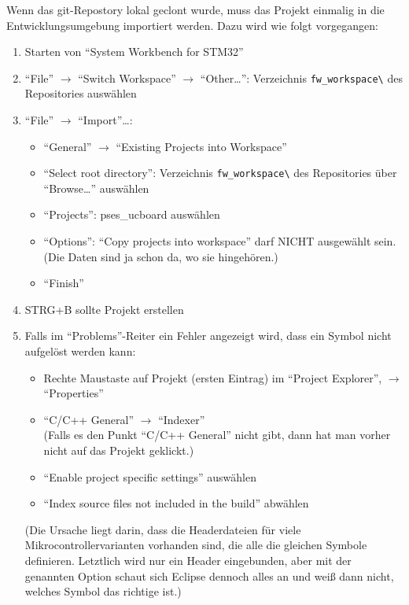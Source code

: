 Wenn das git-Repostory lokal geclont wurde, muss das Projekt einmalig in die Entwicklungsumgebung importiert werden. Dazu wird wie folgt vorgegangen:
\begin{enumerate}
	\item Starten von "`System Workbench for STM32"'
	\item "`File"' $\to$ "`Switch Workspace"' $\to$ "`Other\ldots"': Verzeichnis \verb|fw_workspace\| des Repositories auswählen 
	\item "`File"' $\to$ "`Import"'\ldots:
		\begin{itemize}
			\item "`General"' $\to$ "`Existing Projects into Workspace"'
			\item "`Select root directory"': Verzeichnis \verb|fw_workspace\| des Repositories über "`Browse\ldots"' auswählen 
			\item "`Projects"': pses\_ucboard auswählen
			\item "`Options"': "`Copy projects into workspace"' darf NICHT ausgewählt sein. (Die Daten sind ja schon da, wo sie hingehören.)
			\item "`Finish"'
		\end{itemize}
	\item STRG+B sollte Projekt erstellen
	\item Falls im "`Problems"'-Reiter ein Fehler angezeigt wird, dass ein Symbol nicht aufgelöst werden kann:
		\begin{itemize}
			\item Rechte Maustaste auf Projekt (ersten Eintrag) im "`Project Explorer"', $\to$ "`Properties"'
			\item "`C/C++ General"' $\to$ "`Indexer"'\\ (Falls es den Punkt "`C/C++ General"' nicht gibt, dann hat man vorher nicht auf das Projekt geklickt.)
			\item "`Enable project specific settings"' auswählen
			\item "`Index source files not included in the build"' abwählen
		\end{itemize}
		(Die Ursache liegt darin, dass die Headerdateien für viele Mikrocontrollervarianten vorhanden sind, die alle die gleichen Symbole definieren. Letztlich wird nur ein Header eingebunden, aber mit der genannten Option schaut sich Eclipse dennoch alles an und weiß dann nicht, welches Symbol das richtige ist.)
\end{enumerate}



